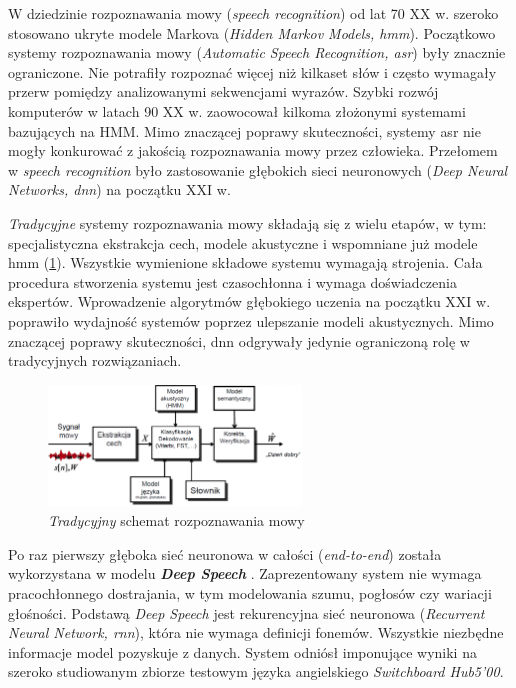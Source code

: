 W dziedzinie rozpoznawania mowy (\textit{speech recognition}) od lat 70 XX w. szeroko stosowano ukryte modele Markova (\textit{Hidden Markov Models, \acrshort{hmm}}). Początkowo systemy rozpoznawania mowy (\textit{Automatic Speech Recognition, \acrshort{asr}}) były znacznie ograniczone. Nie potrafiły rozpoznać więcej niż kilkaset słów i często wymagały przerw pomiędzy analizowanymi sekwencjami wyrazów. Szybki rozwój komputerów w latach 90 XX w. zaowocował kilkoma złożonymi systemami bazujących na HMM. Mimo znaczącej poprawy skuteczności, systemy \acrshort{asr} nie mogły konkurować z jakością rozpoznawania mowy przez człowieka. Przełomem w \textit{speech recognition} było zastosowanie głębokich sieci neuronowych (\textit{Deep Neural Networks, \acrshort{dnn}}) na początku XXI w.

\textit{Tradycyjne} systemy rozpoznawania mowy składają się z wielu etapów, w tym: specjalistyczna ekstrakcja cech, modele akustyczne i wspomniane już modele \acrshort{hmm} (\ref{fig:schemat_rozpoznawania}). Wszystkie wymienione składowe systemu wymagają strojenia. Cała procedura stworzenia systemu jest czasochłonna i wymaga doświadczenia ekspertów. Wprowadzenie algorytmów głębokiego uczenia na początku XXI w. \cite{ds1:feature_learning, ds1:dnn_timit, ds1:accustic_modeling, ds1:dnn_hmh} poprawiło wydajność systemów poprzez ulepszanie modeli akustycznych. Mimo znaczącej poprawy skuteczności, \acrshort{dnn} odgrywały jedynie ograniczoną rolę w tradycyjnych rozwiązaniach.
\begin{figure}[h]
    \centering
    \includegraphics[width=0.6\textwidth]{images/schemat_rozpoznawania.png}
    \caption{\textit{Tradycyjny} schemat rozpoznawania mowy \cite{img_schemat_rozpoznawania}}
    \label{fig:schemat_rozpoznawania}
\end{figure}

Po raz pierwszy głęboka sieć neuronowa w całości (\textit{end-to-end}) została wykorzystana w modelu \textbf{\textit{Deep Speech}} \cite{ds1}. Zaprezentowany system nie wymaga pracochłonnego dostrajania, w tym modelowania szumu, pogłosów czy wariacji głośności. Podstawą \textit{Deep Speech} jest rekurencyjna sieć neuronowa (\textit{Recurrent Neural Network, \acrshort{rnn}}), która nie wymaga definicji fonemów. Wszystkie niezbędne informacje model pozyskuje z danych. System odniósł imponujące wyniki na szeroko studiowanym zbiorze testowym języka angielskiego \textit{Switchboard Hub5’00}.

